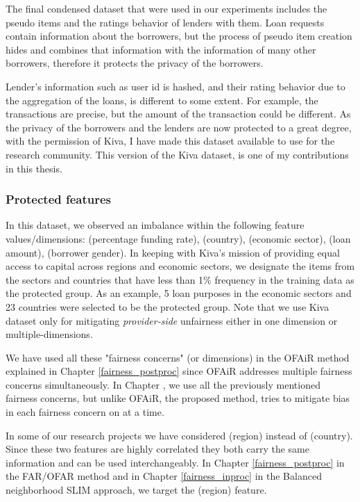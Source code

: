     The final condensed dataset that were used in our experiments includes the pseudo items and the ratings behavior of lenders with them. Loan requests contain information about the borrowers, but the process of pseudo item creation hides and combines that information with the information of many other borrowers, therefore it protects the privacy of the borrowers. 
    
    Lender's information such as user id is hashed, and their rating behavior due to the aggregation of the loans, is different to some extent. For example, the transactions are precise, but the amount of the transaction could be different.
    As the privacy of the borrowers and the lenders are now protected to a great degree, with the permission of Kiva, I have made this dataset available to use for the research community. This version of the Kiva dataset, is one of my contributions in this thesis.


        \subsubsection{Protected features}
        In this dataset, we observed an imbalance within the following feature values/dimensions: (percentage funding rate), (country), (economic sector), (loan amount), (borrower gender). In keeping with Kiva's mission of providing equal access to capital across regions and economic sectors, we designate the items from the sectors and countries that have less than 1\% frequency in the training data as the protected group. As an example, 5 loan purposes in the economic sectors and 23 countries were selected to be the protected group. Note that we use Kiva dataset only for mitigating \textit{provider-side} unfairness either in one dimension or multiple-dimensions.
        
        We have used all these "fairness concerns" (or dimensions) in the OFAiR method explained in Chapter \ref{fairness_postproc} since OFAiR addresses multiple fairness concerns simultaneously. In Chapter , we use all the previously mentioned fairness concerns, but unlike OFAiR, the proposed method, tries to mitigate bias in each fairness concern on at a time.
        
        In some of our research projects we have considered (region) instead of (country). Since these two features are highly correlated they both carry the same information and can be used interchangeably. In Chapter \ref{fairness_postproc} in the FAR/OFAR method and in Chapter \ref{fairness_inproc} in the Balanced neighborhood SLIM approach, we target the (region) feature.
        
